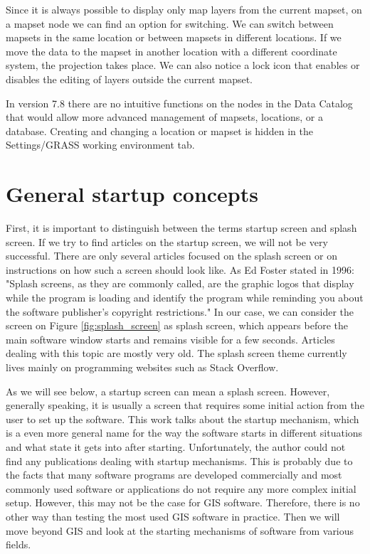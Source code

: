 \documentclass[a4paper,10pt,twoside]{article}
\begin{document}
Since it is always possible to display only map layers from the current mapset, on a mapset node we can find an option for switching. We can switch between mapsets in the same location or between mapsets in different locations. If we move the data to the mapset in another location with a different coordinate system, the projection takes place. We can also notice a lock icon that enables or disables the editing of layers outside the current mapset. 

In version 7.8 there are no intuitive functions on the nodes in the Data Catalog that would allow more advanced management of mapsets, locations, or a database. Creating and changing a location or mapset is hidden in the Settings/GRASS working environment tab.


\newpage
\vspace*{-1cm}
\section{General startup concepts}
\noindent
\large

\noindent First, it is important to distinguish between the terms startup screen and splash screen. If we try to find articles on the startup screen, we will not be very successful. There are only several articles focused on the splash screen or on instructions on how such a screen should look like. As Ed Foster stated in 1996: "Splash screens, as they are commonly called, are the graphic logos that display while the program is loading and identify the program while reminding you about the software publisher's copyright restrictions." In our case, we can consider the screen on Figure \ref{fig:splash_screen} as splash screen, which appears before the main software window starts and remains visible for a few seconds. Articles dealing with this topic are mostly very old. The splash screen theme currently lives mainly on programming websites such as Stack Overflow.

As we will see below, a startup screen can mean a splash screen. However, generally speaking, it is usually a screen that requires some initial action from the user to set up the software. This work talks about the startup mechanism, which is a even more general name for the way the software starts in different situations and what state it gets into after starting. Unfortunately, the author could not find any publications dealing with startup mechanisms. This is probably due to the facts that many software programs are developed commercially and most commonly used software or applications do not require any more complex initial setup. However, this may not be the case for GIS software. Therefore, there is no other way than testing the most used GIS software in practice. Then we will move beyond GIS and look at the starting mechanisms of software from various fields.
\end{document}
